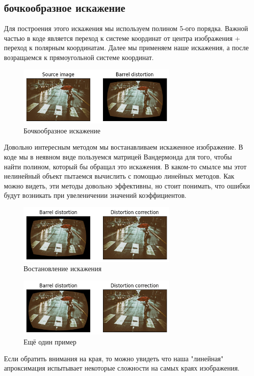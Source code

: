 \documentclass[a4paper,12pt]{article}
\begin{document}
\subsection{бочкообразное искажение}
Для построения этого искажения мы используем полином 5-ого порядка. 
Важной частью в коде является переход к системе координат от центра изображения + переход к полярным координатам. Далее мы применяем наше искажения, а после возращаемся к прямоугольной системе координат. 
\begin{figure}[H]
    \centering \includegraphics[width=0.7\textwidth]{my_images/38.png}
    \caption{Бочкообразное искажение}
\end{figure}
Довольно интересным методом мы востанавливаем искаженное изображение. В коде мы в неявном виде пользуемся матрицей Вандермонда для того, чтобы найти полином, который бы обращал это искажения. В каком-то смылсе мы этот нелинейный объект пытаемся вычислить с помощью линейных методов. Как можно видеть, эти методы довольно эффективны, но стоит понимать, что ошибки будут возникать при увеленичении значений коэффициентов. 
\begin{figure}[H]
    \centering \includegraphics[width=0.7\textwidth]{my_images/39.png}
    \caption{Востановление искажения}
\end{figure}
\begin{figure}[H]
    \centering \includegraphics[width=0.7\textwidth]{my_images/40.png}
    \caption{Ещё один пример}
\end{figure}
Если обратить внимания на края, то можно увидеть что наша "линейная" апроксимация испытывает некоторые сложности на самых краях изображения. 
\end{document}
